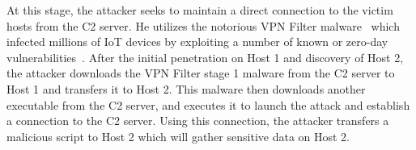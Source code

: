 At this stage, the attacker seeks to maintain a direct connection to the victim hosts from the C2 server. 
He utilizes the notorious VPN Filter malware~\cite{vpnfilterschenier} which infected millions of IoT devices by exploiting a number of known or zero-day vulnerabilities~\cite{vpnfilter1,vpnfilter2}. 
After the initial penetration on Host 1 and discovery of Host 2, the attacker downloads the VPN Filter stage 1 malware from the C2 server to Host 1 and transfers it to Host 2.
This malware then downloads another executable from the C2 server, and executes it to launch the attack and establish a connection to the C2 server.
Using this connection, the attacker transfers a malicious script to Host 2 which will gather sensitive data on Host 2.

